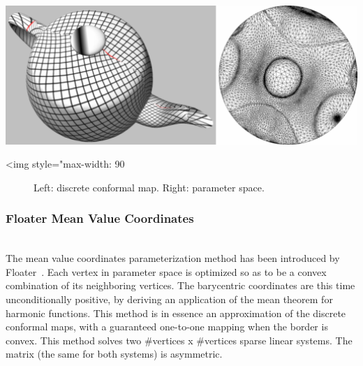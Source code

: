 \begin{center}
    \label{Surface_mesh_parameterization-fig-conformal}
    \begin{ccTexOnly}
        \includegraphics[width=1.0\textwidth]{Surface_mesh_parameterization/conformal}
    \end{ccTexOnly}
    \begin{ccHtmlOnly}
        <img style="max-width: 90%
    \end{ccHtmlOnly}
    \begin{figure}[ht]
        \caption{Left: discrete conformal map. Right: parameter space.}
    \end{figure}
\end{center}

\subsubsection{Floater Mean Value Coordinates}

  \\

The mean value coordinates parameterization method has been introduced
by Floater~\cite{cgal:f-mvc-03}. Each vertex in parameter space is
optimized so as to be a convex combination of its neighboring
vertices. The barycentric coordinates are this time unconditionally
positive, by deriving an application of the mean theorem for harmonic
functions. This method is in essence an approximation of the discrete conformal
maps, with a guaranteed one-to-one mapping when the border is convex.
This method solves two \#vertices x \#vertices sparse linear systems. The matrix (the
same for both systems) is asymmetric.

